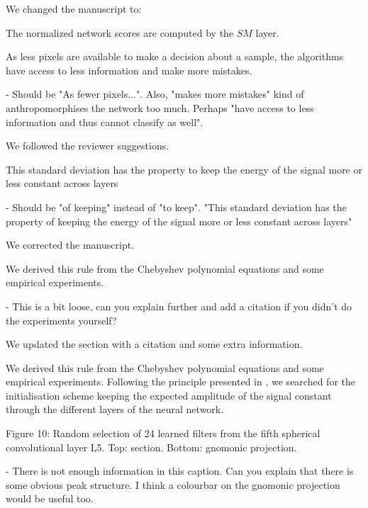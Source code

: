 \documentclass[12pt,a4paper]{article}
\newcommand{\nati}[1]{{\color[rgb]{.1,.6,.1}{NP: #1}}}
\newcommand{\TK}[1]{{\color{red}{TK: #1}}}
\newcommand{\todo}[1]{{\color[rgb]{.6,.1,.6}{TODO: #1}}}
\newcommand{\1}{\b{1}}              %
\newcommand{\0}{\b{0}}              %
\begin{document}
We changed the manuscript to:
\begin{mdframed}[style=comment]
The normalized network scores are computed by the $SM$ layer.
\end{mdframed}

\begin{mdframed}[style=comment]
As less pixels are available to make a decision about a sample, the algorithms have access to less information and make more mistakes.

- Should be "As fewer pixels...". Also, "makes more mistakes" kind of anthropomorphises the network too much. Perhaps "have access to less information and thus cannot classify as well".
\end{mdframed}
We followed the reviewer suggestions.

\begin{mdframed}[style=comment]
This standard deviation has the property to keep the energy of the signal more or less constant across layers

- Should be "of keeping" instead of "to keep". "This standard deviation has the property of keeping the energy of the signal more or less constant across layers"
\end{mdframed}
We corrected the manuscript.

\begin{mdframed}[style=comment]
We derived this rule from the Chebyshev polynomial equations and some empirical experiments.

- This is a bit loose, can you explain further and add a citation if you didn't do the experiments yourself?
\end{mdframed}
We updated the section with a citation and some extra information.
\begin{mdframed}[style=manuscript]
We derived this rule from the Chebyshev polynomial equations and some empirical experiments. Following the principle presented in \cite{glorot2010understanding}, we searched for the initialisation scheme keeping the expected amplitude of the signal constant through the different layers of the neural network.
\end{mdframed}

\begin{mdframed}[style=comment]
Figure 10: Random selection of 24 learned filters from the fifth spherical convolutional layer L5. Top: section. Bottom: gnomonic projection.

- There is not enough information in this caption. Can you explain that there is some obvious peak structure. I think a colourbar on the gnomonic projection would be useful too.
\end{mdframed}
\todo{Assign: @all}
\TK{Added sentence}
\end{document}
